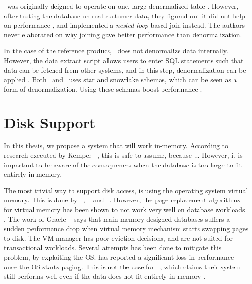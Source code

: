 \blink~was originally deigned to operate on one, large denormalized table \cite{Johnson2008-cp}. However, after testing the database on real customer data, they figured out it did not help on performance \cite{Barber2012-xt}, and implemented a \textit{nested loop} based join instead. The authors never elaborated on why joining gave better performance than denormalization.

In the case of the reference producs, \qlikview~does not denormalize data internally. However, the data extract script allows users to enter SQL statements such that data can be fetched from other systems, and in this step, denormalization can be applied \cite{Qlik2011-yc}. Both \qlikview~and \tableau~uses star and snowflake schemas, which can be seen as a form of denormalization. Using these schemas boost performance \cite{Kamkolkar2015-iq}.


\section{Disk Support}
\label{sec:Disk Support}
In this thesis, we propose a system that will work in-memory. According to research executed by Kemper \ea~\cite{Kemper2011-ap}, this is safe to assume, because ... However, it is important to be aware of the consequences when the database is too large to fit entirely in memory.

The most trivial way to support disk access, is using the operating system virtual memory. This is done by \monetdb~\cite{Boncz2002-yj}, \blink~\cite{Barber2014-ey} and \qlikview~\cite{Qlik2011-ef}. However, the page replacement algorithms for virtual memory has been shown to not work very well on database workloads . The work of Graefe \ea~\cite{Graefe2014-ds} says that main-memory designed databases suffers a sudden performance drop when virtual memory mechanism starts swapping pages to disk. The VM manager has poor eviction decisions, and are not suited for transactional workloads. Several attempts has been done to mitigate this problem, by exploiting the OS. \qlikview has reported a significant loss in performance once the OS starts paging. This is not the case for \tableau~, which claims their system still performs well even if the data does not fit entirely in memory \cite{Kamkolkar2015-iq}.

